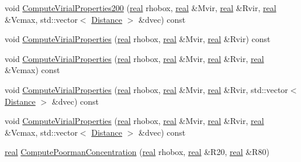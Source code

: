 \begin{DoxyCompactItemize}
\item 
void \hyperlink{classHaloProperties_a21c2e9833f9bec47f9c452cee9752996}{ComputeVirialProperties200} (\hyperlink{Global_8h_a031f8951175b43076c2084a6c2173410}{real} rhobox, \hyperlink{Global_8h_a031f8951175b43076c2084a6c2173410}{real} \&Mvir, \hyperlink{Global_8h_a031f8951175b43076c2084a6c2173410}{real} \&Rvir, \hyperlink{Global_8h_a031f8951175b43076c2084a6c2173410}{real} \&Vcmax, std::vector$<$ \hyperlink{classHaloProperties_1_1Distance}{Distance} $>$ \&dvec) const 
\item 
void \hyperlink{classHaloProperties_ad132159c56a38018afbe7c360803363c}{ComputeVirialProperties} (\hyperlink{Global_8h_a031f8951175b43076c2084a6c2173410}{real} rhobox, \hyperlink{Global_8h_a031f8951175b43076c2084a6c2173410}{real} \&Mvir, \hyperlink{Global_8h_a031f8951175b43076c2084a6c2173410}{real} \&Rvir) const 
\item 
void \hyperlink{classHaloProperties_ab703450a3ad8b89221ae9463e0a2d58d}{ComputeVirialProperties} (\hyperlink{Global_8h_a031f8951175b43076c2084a6c2173410}{real} rhobox, \hyperlink{Global_8h_a031f8951175b43076c2084a6c2173410}{real} \&Mvir, \hyperlink{Global_8h_a031f8951175b43076c2084a6c2173410}{real} \&Rvir, \hyperlink{Global_8h_a031f8951175b43076c2084a6c2173410}{real} \&Vcmax) const 
\item 
void \hyperlink{classHaloProperties_a489eb6a9bcc51e46f3c3db91a4f104da}{ComputeVirialProperties} (\hyperlink{Global_8h_a031f8951175b43076c2084a6c2173410}{real} rhobox, \hyperlink{Global_8h_a031f8951175b43076c2084a6c2173410}{real} \&Mvir, \hyperlink{Global_8h_a031f8951175b43076c2084a6c2173410}{real} \&Rvir, std::vector$<$ \hyperlink{classHaloProperties_1_1Distance}{Distance} $>$ \&dvec) const 
\item 
void \hyperlink{classHaloProperties_a1363b40a961c241a3099133e79969f8a}{ComputeVirialProperties} (\hyperlink{Global_8h_a031f8951175b43076c2084a6c2173410}{real} rhobox, \hyperlink{Global_8h_a031f8951175b43076c2084a6c2173410}{real} \&Mvir, \hyperlink{Global_8h_a031f8951175b43076c2084a6c2173410}{real} \&Rvir, \hyperlink{Global_8h_a031f8951175b43076c2084a6c2173410}{real} \&Vcmax, std::vector$<$ \hyperlink{classHaloProperties_1_1Distance}{Distance} $>$ \&dvec) const 
\item 
\hyperlink{Global_8h_a031f8951175b43076c2084a6c2173410}{real} \hyperlink{classHaloProperties_ac961040b7e402a1c1aca40f1968a3387}{ComputePoormanConcentration} (\hyperlink{Global_8h_a031f8951175b43076c2084a6c2173410}{real} rhobox, \hyperlink{Global_8h_a031f8951175b43076c2084a6c2173410}{real} \&R20, \hyperlink{Global_8h_a031f8951175b43076c2084a6c2173410}{real} \&R80)

\end{DoxyCompactItemize}
